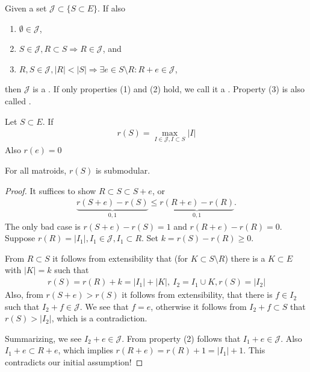 \begin{definition}[Matroid]
    Given a set $\mathcal{J} \subset \{S \subset E\}$. If also
    \begin{enumerate}
        \item $\emptyset \in \mathcal{J}$,
        \item $S \in \mathcal{J}, R \subset S \Rightarrow R \in \mathcal{J}$, and
        \item $R,S \in \mathcal{J}, |R|< |S| \Rightarrow \exists e \in S\setminus R: R+e\in \mathcal{J}$,
    \end{enumerate}
    then $\mathcal{J}$ is a . If only properties (1) and (2) hold, we call it a .
    Property (3) is also called .
\end{definition}
\begin{definition}[Matroid]
    Let $S \subset E$.
    If \begin{align*}
        r(S) = \max_{I \in \mathcal{J}, I \subset S} |I|
    \end{align*}
    Also $r({e})=0$
\end{definition}
\begin{theorem}
    For all matroids, $r(S)$ is submodular.
\end{theorem}
\begin{proof}
    It suffices to show $R \subset S \subset S+e$, or 
    \begin{align*}
        \underbrace{r(S+e) - r(S)}_{0,1} \leq \underbrace{r(R+e) - r(R)}_{0,1}.
    \end{align*}
    The only bad case is $r(S+e)-r(S)=1$ and $r(R+e)-r(R)=0$.
    Suppose $r(R) = |I_1|, I_1 \in \mathcal{J}, I_1 \subset R$. Set $k = r(S)-r(R) \geq 0$.
    
    From $R \subset S$ it follows from extensibility that (for $K \subset S \setminus R$) there is a $K \subset E$ with $|K|=k$ such that
    \begin{align*}
        r(S)=r(R)+k=|I_1|+|K|,\ I_2=I_1 \cup K, r(S)=|I_2|
    \end{align*}
    Also, from $r(S+e) > r(S)$ it follows from extensibility, that there is $f \in I_2$ such that $I_2+f \in \mathcal{J}$.
    We see that $f=e$, otherwise it follows from $I_2+f \subset S$ that $r(S) > |I_2|$, which is a contradiction.

    Summarizing, we see $I_2+e \in \mathcal{J}$. 
    From property (2) follows that $I_1+e \in \mathcal{J}$.
    Also $I_1 +e \subset R +e$, which implies $r(R+e)=r(R)+1=|I_1|+1$. This contradicts our initial assumption!
\end{proof}

